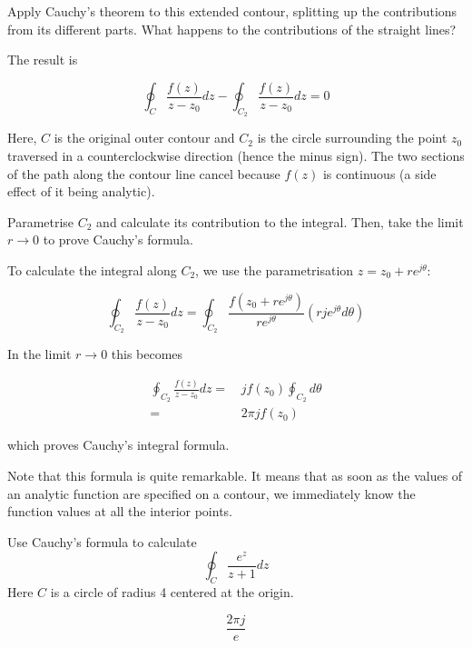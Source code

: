 \begin{cue}
Apply Cauchy's theorem to this extended contour, splitting up the contributions from its different parts. What happens to the contributions of the straight lines?
\end{cue}

The result is

\begin{equation}
\oint_{{C}} \frac{f(z)} {z-z_0} dz -\oint_{{C}_2} \frac{f(z)}
{z-z_0} dz=0
\end{equation} 

Here, ${C}$ is the original outer contour and ${C}_2$ is the circle surrounding the point $z_0$ traversed in a counterclockwise direction (hence the minus sign). The two sections of the path along the contour line cancel because $f(z)$ is continuous (a side effect of it being analytic).

\begin{cue}
Parametrise ${C}_2$ and calculate its contribution to the integral. Then, take the limit $ r \to 0 $ to prove Cauchy's formula.   
\end{cue}

To calculate the integral along ${C}_2$, we use the parametrisation $z=z_0 + r e^{j\theta}$:

\begin{equation}
\oint_{{C}_2} \frac{f(z)} {z-z_0} dz = \oint_{{C}_2} \frac{f(z_0
+ r e^{j\theta})} {r e^{j\theta}} \left(rje^{j \theta} d \theta\right)
\end{equation}

In the limit $ r \to 0 $ this becomes

\begin{align}
\oint_{{C}_2} \frac{f(z)} {z-z_0} dz = & \, j f(z_0) \oint_{{C}_2} d \theta \nonumber \\
 = & \, 2 \pi j f(z_0)
\end{align}
 
which proves Cauchy's integral formula.

Note that this formula is quite remarkable. It means that as soon as the values of an analytic function are specified on a contour, we immediately know the function values at all the interior points.

\begin{exer}
Use Cauchy's formula to calculate 
$$\oint_{{C}}  \frac {e^z} {z+1} dz$$
Here ${C}$ is a circle of radius 4 centered at the origin.
\begin{sol}
$$\frac{2 \pi j}{e}$$
\end{sol}
\end{exer}

